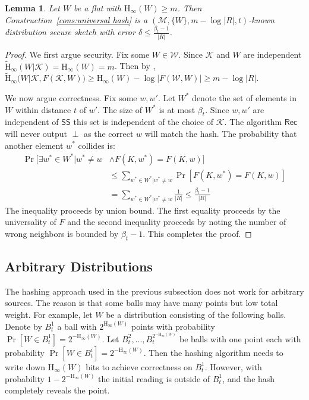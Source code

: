 \documentclass[11pt]{article}
\newtheorem{lemma}[theorem]{Lemma}
\newcommand{\consref}[1]{\mbox{Construction~\ref{#1}}}
\newcommand{\class}[1]{{\ensuremath{\mathsf{#1}}}}
\newcommand{\sketch}{\ensuremath{\class{SS}}\xspace}
\newcommand{\rec}{\ensuremath{\class{Rec}}\xspace}
\newcommand{\Hoo}{\mathrm{H}_\infty}
\newcommand{\Hav}{\tilde{\mathrm{H}}_\infty}
\newcommand{\Hfuzz}{\mathrm{H}^{\mathtt{fuzz}}_{t,\infty}}
\begin{document}
\begin{lemma}
\label{lem:flat hashing}
Let $W$ be a flat with $\Hoo(W)\ge m$.  Then
\consref{cons:universal hash} is a $(\mathcal{M}, \{W\}, m - \log |R|, t)$-known distribution secure sketch with error $\delta \le \frac{\beta_{t}-1}{|R|}$. 
\end{lemma}
\begin{proof}
We first argue security.  Fix some $W\in\mathcal{W}$. Since $\mathcal{K}$ and $W$ are independent $\Hav(W | \mathcal{K}) = \Hoo(W) = m$.  Then by \cite[Lemma 2.2b]{DBLP:journals/siamcomp/DodisORS08}, $\Hav(W | \mathcal{K}, F(\mathcal{K}, W)) \ge \Hoo(W) - \log |F(\mathcal{W}, W)| \ge m - \log |R|$.

\noindent
We now argue correctness.  Fix some $w, w'$.  Let $W^*$ denote the set of elements in $W$ within distance $t$ of $w'$.  The size of $W^*$ is at most $\beta_{t}$.  Since $w, w'$ are independent of $\sketch$ this set is independent of the choice of $\mathcal{K}$.  The algorithm  $\rec$ will never output $\perp$ as the correct $w$ will match the hash.  The probability that another element $w^*$ collides is:
\begin{align*}
\Pr[\exists w^* \in W^* |w^* \neq w &\wedge F(K, w^*) = F(K, w)] \\&\le \sum_{w^*\in W^* | w^*\neq w} \Pr[F(K, w^*) = F(K, w)] \\
 &= \sum_{w^*\in W^* | w^*\neq w} \frac{1}{|R|} \le \frac{\beta_{t}-1}{|R|}
\end{align*}
The inequality proceeds by union bound. The first equality proceeds by the universality of $F$ and the second inequality proceeds by noting the number of wrong neighbors is bounded by $\beta_{t}-1$.  This completes the proof.
\end{proof}


\subsection{Arbitrary Distributions}
The hashing approach used in the previous subsection does not work for arbitrary sources.  The reason is that some balls may have  many points but low total weight. For example, let $W$ be a distribution consisting of the following balls. Denote by $B^1_t$ a ball with $2^{\Hoo(W)}$ points with probability $\Pr[W\in B^1_t] =2^{-\Hoo(W)}$.  Let $B^2_t,..., B^{2^{-\Hoo(W)}}_t$ be balls with one point each with probability $\Pr[W\in B^i_t] = 2^{-\Hoo(W)}$.  Then the hashing algorithm needs to write down $\Hoo(W)$ bits to achieve correctness on $B^1_t$.  However, with probability $1-2^{-\Hoo(W)}$ the initial reading is outside of $B^1_t$, and the hash completely reveals the point.  
\end{document}
